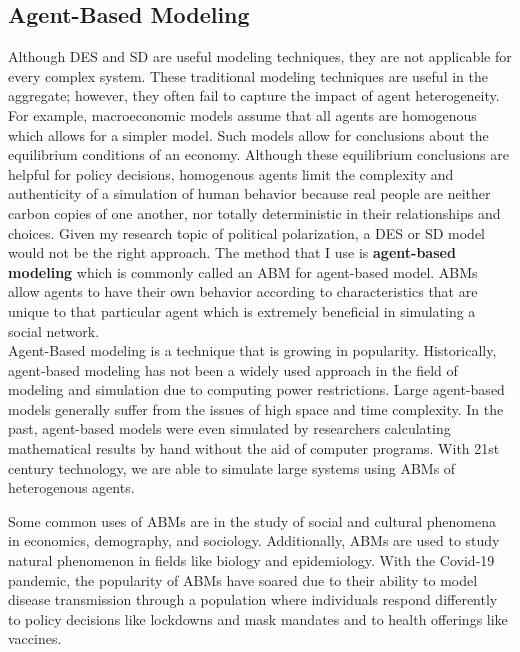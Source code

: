 \subsection{Agent-Based Modeling}
Although DES and SD are useful modeling techniques, they are not applicable for every complex system. These traditional modeling techniques are useful in the aggregate; however, they often fail to capture the impact of agent heterogeneity. For example, macroeconomic models assume that all agents are homogenous which allows for a simpler model. Such models allow for conclusions about the equilibrium conditions of an economy. Although these equilibrium conclusions are helpful for policy decisions, homogenous agents limit the complexity and authenticity of a simulation of human behavior because real people are neither carbon copies of one another, nor totally deterministic in their relationships and choices. Given my research topic of political polarization, a DES or SD model would not be the right approach. The method that I use is \textbf{agent-based modeling} which is commonly called an ABM for agent-based model. ABMs allow agents to have their own behavior according to characteristics that are unique to that particular agent which is extremely beneficial in simulating a social network. \\

Agent-Based modeling is a technique that is growing in popularity. Historically, agent-based modeling has not been a widely used approach in the field of modeling and simulation due to computing power restrictions. Large agent-based models generally suffer from the issues of high space and time complexity. In the past, agent-based models were even simulated by researchers calculating mathematical results by hand without the aid of computer programs. With 21st century technology, we are able to simulate large systems using ABMs of heterogenous agents. 

Some common uses of ABMs are in the study of social and cultural phenomena in economics, demography, and sociology. Additionally, ABMs are used to study natural phenomenon in fields like biology and epidemiology. With the Covid-19 pandemic, the popularity of ABMs have soared due to their ability to model disease transmission through a population where individuals respond differently to policy decisions like lockdowns and mask mandates and to health offerings like vaccines. 

